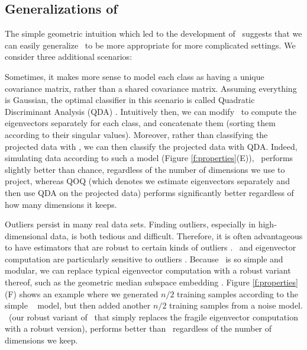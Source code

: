 \documentclass[10pt]{article}
\begin{document}
\subsection*{Generalizations of \Lol}

The simple geometric intuition which led to the development of \Lol~suggests that we can easily generalize \Lol~to be more appropriate for more complicated settings. We consider three additional scenarios:

 Sometimes, it makes more sense to model each class as having a unique covariance matrix, rather than a shared covariance matrix.  Assuming everything is Gaussian, the optimal classifier in this scenario is called  Quadratic Discriminant Analysis (QDA) \cite{Hastie2004}.  Intuitively then, we can modify \Lol~to compute the eigenvectors separately for each class, and concatenate them (sorting them according to their singular values).  Moreover, rather than classifying the projected data with \Lda, we can then classify the projected data with QDA.  Indeed, simulating data according to such a model (Figure \ref{f:properties}(E)), \Lol~performs slightly better than chance, regardless of the number of dimensions we use to project, whereas QOQ (which denotes we estimate eigenvectors separately and then use QDA on the projected data) performs significantly better regardless of how many dimensions it keeps.

  Outliers persist in many real data sets.  Finding outliers, especially in high-dimensional data, is both tedious and difficult.  Therefore, it is often advantageous to have estimators that are robust to certain kinds of outliers \cite{Huber1981a,Rousseeuw1999a,Ferrari2010a}.  \Pca~and eigenvector computation are particularly sensitive to outliers \cite{Candes2009b}.  Because \Lol~is so simple and modular, we can replace typical eigenvector computation with a robust variant thereof, such as the geometric median subspace embedding \cite{Zhang2014a}.  Figure \ref{f:properties}(F) shows an example where we generated  $n/2$ training samples according to the simple \Lda~ model, but then added another $n/2$ training samples from a noise model.  \Lrl~(our robust variant of \Lol~that simply replaces the fragile eigenvector computation with a robust version), performs better than \Lol~regardless of the number of dimensions we keep.
\end{document}
